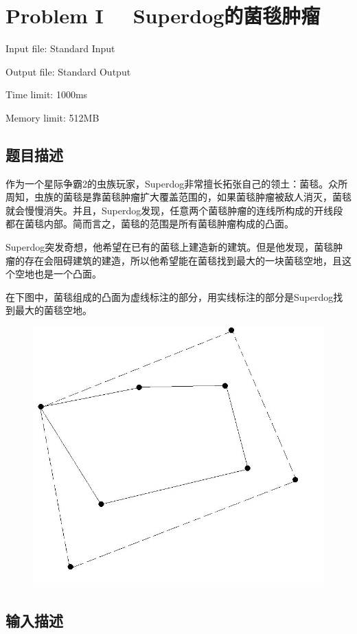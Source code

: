 \newpage
\section{Problem I \ \ Superdog的菌毯肿瘤}
{ \limitfont{}
Input file: Standard Input \par
Output file: Standard Output \par
Time limit: 1000ms \par
Memory limit: 512MB \par
}
\subsection*{题目描述}
作为一个星际争霸2的虫族玩家，Superdog非常擅长拓张自己的领土：菌毯。众所周知，虫族的菌毯是靠菌毯肿瘤扩大覆盖范围的，如果菌毯肿瘤被敌人消灭，菌毯就会慢慢消失。并且，Superdog发现，任意两个菌毯肿瘤的连线所构成的开线段都在菌毯内部。简而言之，菌毯的范围是所有菌毯肿瘤构成的凸面。

Superdog突发奇想，他希望在已有的菌毯上建造新的建筑。但是他发现，菌毯肿瘤的存在会阻碍建筑的建造，所以他希望能在菌毯找到最大的一块菌毯空地，且这个空地也是一个凸面。

在下图中，菌毯组成的凸面为虚线标注的部分，用实线标注的部分是Superdog找到最大的菌毯空地。
\begin{figure}[H]
    \centering
    \includegraphics[scale=0.6]{./src/k.png}
\end{figure}
\subsection*{输入描述}

